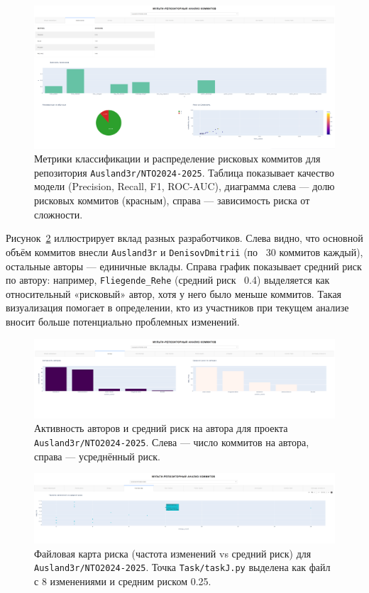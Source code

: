 \begin{figure}[H]
	\centering
	\includegraphics[width=\textwidth]{my_folder/images/second_page.png}
	\caption{Метрики классификации и распределение рисковых коммитов для репозитория \texttt{Ausland3r/NTO2024-2025}. Таблица показывает качество модели (Precision, Recall, F1, ROC-AUC), диаграмма слева — долю рисковых коммитов (красным), справа — зависимость риска от сложности.}
	\label{fig:risk_analysis}
\end{figure}

Рисунок~\ref{fig:authors} иллюстрирует вклад разных разработчиков. Слева видно, что основной объём коммитов внесли \texttt{Ausland3r} и \texttt{DenisovDmitrii} (по ~30 коммитов каждый), остальные авторы — единичные вклады. Справа график показывает средний риск по автору: например, \texttt{Fliegende\_Rehe} (средний риск ~0.4) выделяется как относительный «рисковый» автор, хотя у него было меньше коммитов. Такая визуализация помогает в определении, кто из участников при текущем анализе вносит больше потенциально проблемных изменений.

 \begin{figure}[ht]
	\centering
	\includegraphics[width=\textwidth]{my_folder/images/third_page.png}
	\caption{Активность авторов и средний риск на автора для проекта \texttt{Ausland3r/NTO2024-2025}. Слева — число коммитов на автора, справа — усреднённый риск.}
	\label{fig:authors}
\end{figure}
 \begin{figure}[ht]
	\centering
	\includegraphics[width=\textwidth]{my_folder/images/forth_page.png}
	\caption{Файловая карта риска (частота изменений vs средний риск) для \texttt{Ausland3r/NTO2024-2025}. Точка \texttt{Task/taskJ.py} выделена как файл с 8 изменениями и средним риском 0.25.}
	\label{fig:file_risk}
\end{figure}

